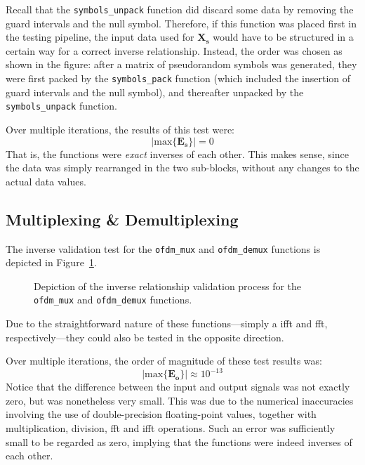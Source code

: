 \documentclass[class=report,11pt,crop=false]{standalone}
\begin{document}
Recall that the \texttt{symbols\_unpack} function did discard some data by removing the guard intervals and the null symbol. Therefore, if this function was placed first in the testing pipeline, the input data used for \(\mathbf{X_s}\) would have to be structured in a certain way for a correct inverse relationship. Instead, the order was chosen as shown in the figure: after a matrix of pseudorandom symbols was generated, they were first packed by the \texttt{symbols\_pack} function (which included the insertion of guard intervals and the null symbol), and thereafter unpacked by the \texttt{symbols\_unpack} function.

Over multiple iterations, the results of this test were:
\begin{equation}
  \left| \mathrm{max} \{ \mathbf{E_s} \} \right| = 0
\end{equation}
That is, the functions were \emph{exact} inverses of each other. This makes sense, since the data was simply rearranged in the two sub-blocks, without any changes to the actual data values.

\subsection{ Multiplexing \& Demultiplexing}
The inverse validation test for the \texttt{ofdm\_mux} and \texttt{ofdm\_demux} functions is depicted in Figure~\ref{fig:inverse-ofdm-mux-demux}.

\begin{figure}[htbp]
  \centering
  \captionsetup{type=figure}
  \def\svgwidth{0.95\linewidth}
  { %
      }
  \caption{Depiction of the inverse relationship validation process for the \texttt{ofdm\_mux} and \texttt{ofdm\_demux} functions.}
  \label{fig:inverse-ofdm-mux-demux}
\end{figure}

Due to the straightforward nature of these functions---simply a \gls{ifft} and \gls{fft}, respectively---they could also be tested in the opposite direction.

Over multiple iterations, the order of magnitude of these test results was:
\begin{equation}
  \left| \mathrm{max} \{ \mathbf{E_o} \} \right| \approx 10^{-13}
\end{equation}
Notice that the difference between the input and output signals was not exactly zero, but was nonetheless very small. This was due to the numerical inaccuracies involving the use of double-precision floating-point values, together with multiplication, division, \gls{fft} and \gls{ifft} operations. Such an error was sufficiently small to be regarded as zero, implying that the functions were indeed inverses of each other.
\end{document}
